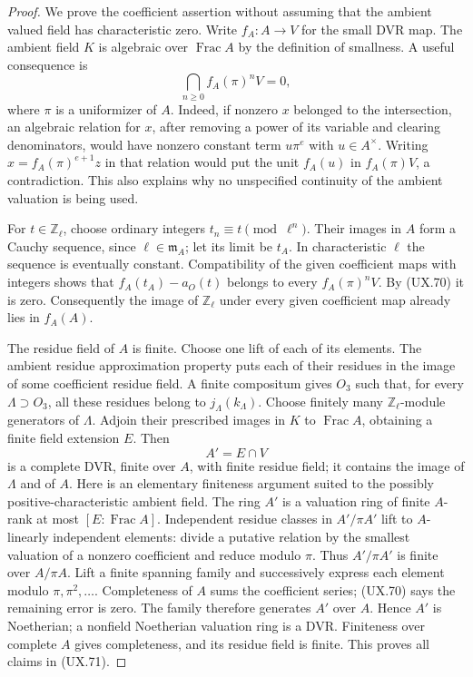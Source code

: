 \begin{proof}
We prove the coefficient assertion without assuming that
the ambient valued field has characteristic zero.
Write $f_A:A\to V$ for the small DVR map.  The ambient
field $K$ is algebraic over $\operatorname{Frac}A$ by
the definition of smallness.  A useful consequence is
\[
 \bigcap_{n\ge0}f_A(\pi)^nV=0,
 \tag{UX.70}
\]
where $\pi$ is a uniformizer of $A$.
Indeed, if nonzero $x$ belonged to the intersection,
an algebraic relation for $x$, after removing a power
of its variable and clearing denominators, would have
nonzero constant term $u\pi^e$ with $u\in A^\times$.
Writing $x=f_A(\pi)^{e+1}z$ in that relation would
put the unit $f_A(u)$ in $f_A(\pi)V$, a contradiction.
This also explains why no unspecified continuity of
the ambient valuation is being used.

For $t\in\mathbb Z_\ell$, choose ordinary integers
$t_n\equiv t\pmod{\ell^n}$.  Their images in $A$
form a Cauchy sequence, since $\ell\in\mathfrak m_A$;
let its limit be $t_A$.  In characteristic $\ell$
the sequence is eventually constant.  Compatibility
of the given coefficient maps with integers shows
that
$f_A(t_A)-a_O(t)$ belongs to every
$f_A(\pi)^nV$.  By (UX.70) it is zero.  Consequently
the image of $\mathbb Z_\ell$ under every given
coefficient map already lies in $f_A(A)$.

The residue field of $A$ is finite.  Choose one lift
of each of its elements.  The ambient residue
approximation property puts each of their residues
in the image of some coefficient residue field.
A finite compositum gives $O_3$ such that, for every
$\Lambda\supset O_3$, all these residues belong to
$j_\Lambda(k_\Lambda)$.
Choose finitely many $\mathbb Z_\ell$-module generators
of $\Lambda$.  Adjoin their prescribed images in $K$
to $\operatorname{Frac}A$, obtaining a finite field
extension $E$.  Then
\[
 A'=E\cap V
 \tag{UX.71}
\]
is a complete DVR, finite over $A$, with finite residue
field; it contains the image of $\Lambda$ and of $A$.
Here is an elementary finiteness argument suited to
the possibly positive-characteristic ambient field.
The ring $A'$ is a valuation ring of finite $A$-rank
at most $[E:\operatorname{Frac}A]$.  Independent
residue classes in $A'/\pi A'$ lift to $A$-linearly
independent elements: divide a putative relation by
the smallest valuation of a nonzero coefficient and
reduce modulo $\pi$.  Thus $A'/\pi A'$ is finite
over $A/\pi A$.  Lift a finite spanning family and
successively express each element modulo
$\pi,\pi^2,\ldots$.  Completeness of $A$ sums the
coefficient series; (UX.70) says the remaining error
is zero.  The family therefore generates $A'$ over
$A$.  Hence $A'$ is Noetherian; a nonfield
Noetherian valuation ring is a DVR.  Finiteness
over complete $A$ gives completeness, and its residue
field is finite.  This proves all claims in (UX.71).


\end{proof}
